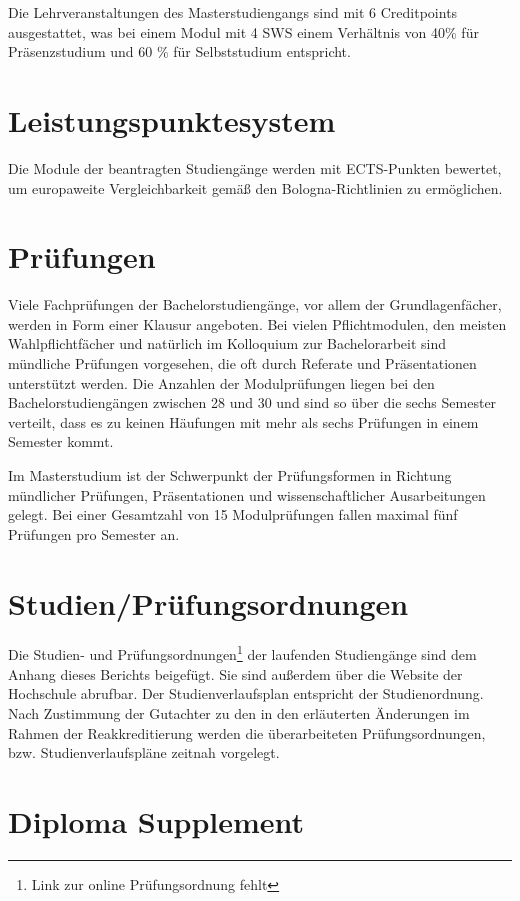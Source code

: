 Die Lehrveranstaltungen des Masterstudiengangs sind mit 6 Creditpoints
ausgestattet, was bei einem Modul mit 4 SWS einem Verhältnis von 40\%
für Präsenzstudium und 60 \% für Selbststudium entspricht.

\section{Leistungspunktesystem}\label{leistungspunktesystem}

Die Module der beantragten Studiengänge werden mit ECTS-Punkten
bewertet, um europaweite Vergleichbarkeit gemäß den Bologna-Richtlinien
zu ermöglichen.

\section{Prüfungen}\label{pruxfcfungen}

Viele Fachprüfungen der Bachelorstudiengänge, vor allem der
Grundlagenfächer, werden in Form einer Klausur angeboten. Bei vielen
Pflichtmodulen, den meisten Wahlpflichtfächer und natürlich im
Kolloquium zur Bachelorarbeit sind mündliche Prüfungen vorgesehen, die
oft durch Referate und Präsentationen unterstützt werden. Die Anzahlen
der Modulprüfungen liegen bei den Bachelorstudiengängen zwischen 28 und
30 und sind so über die sechs Semester verteilt, dass es zu keinen
Häufungen mit mehr als sechs Prüfungen in einem Semester kommt.

Im Masterstudium ist der Schwerpunkt der Prüfungsformen in Richtung
mündlicher Prüfungen, Präsentationen und wissenschaftlicher
Ausarbeitungen gelegt. Bei einer Gesamtzahl von 15 Modulprüfungen fallen
maximal fünf Prüfungen pro Semester an.

\section{Studien/Prüfungsordnungen}\label{studienpruxfcfungsordnungen}

Die Studien- und Prüfungsordnungen\footnote{Link zur online
  Prüfungsordnung fehlt} der laufenden Studiengänge sind dem Anhang
dieses Berichts beigefügt. Sie sind außerdem über die Website der
Hochschule abrufbar. Der Studienverlaufsplan entspricht der
Studienordnung. Nach Zustimmung der Gutachter zu den in den erläuterten
Änderungen im Rahmen der Reakkreditierung werden die überarbeiteten
Prüfungsordnungen, bzw. Studienverlaufspläne zeitnah vorgelegt.

\section{Diploma Supplement}\label{diploma-supplement}

